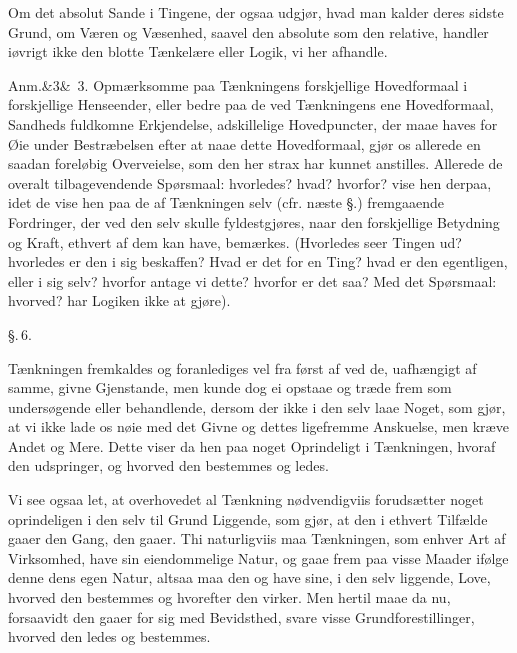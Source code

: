 \documentclass[12pt]{book}
\def\sperr#1{#1}%
\def\textit#1{#1}%
\def\emph#1{#1}%
\newcommand{\sperr}[1]{\textls[180]{#1}}
\newcommand{\parag}[1]{%
  \par\vspace{0.9\baselineskip}%
  {\centering\textit{\S.\,#1.}\par}%
  \vspace{0.35\baselineskip}%
  \noindent\hspace{\parindent}\ignorespaces
}
\newcommand{\anm}[1]{%
  \par\vspace{0.5\baselineskip}%
  \noindent\hspace{\parindent}\sperr{Anm.}\ifx&#1&\else~\textit{#1}.\fi
  \enspace\ignorespaces
}
\newcommand{\opage}[1]{\marginnote{\footnotesize\textit{[#1]}}}
\begin{document}
Om det \emph{absolut} Sande i Tingene, der ogsaa udgjør, hvad man kalder deres
sidste Grund, om Væren og Væsenhed, saavel den \emph{absolute}
\opage{20} som den \emph{relative}, handler iøvrigt ikke den blotte Tænkelære eller Logik,
vi her afhandle.

\anm{3} Opmærksomme paa Tænkningens forskjellige Hovedformaal i forskjellige
Henseender, eller bedre paa de ved Tænkningens ene Hovedformaal, Sandheds
fuldkomne Erkjendelse, adskillelige Hovedpuncter, der maae haves for Øie under
Bestræbelsen efter at naae dette Hovedformaal, gjør os allerede en saadan
foreløbig Overveielse, som den her strax har kunnet anstilles. Allerede de
overalt tilbagevendende Spørsmaal: \emph{hvorledes? hvad? hvorfor?} vise hen
derpaa, idet de vise hen paa de af Tænkningen selv (cfr. næste §.) fremgaaende
Fordringer, der ved den selv skulle fyldestgjøres, naar den forskjellige
Betydning og Kraft, ethvert af dem kan have, bemærkes. (Hvorledes seer Tingen
ud? hvorledes er den i sig beskaffen? Hvad er det for en Ting? hvad er den
egentligen, eller i sig selv? hvorfor antage vi dette? hvorfor er det saa? Med
det Spørsmaal: hvorved? har Logiken ikke at gjøre).

\parag{6}
Tænkningen fremkaldes og foranlediges vel fra først af ved de, uafhængigt af
samme, givne Gjenstande, men kunde dog ei opstaae og træde frem som
undersøgende eller behandlende, dersom der ikke i den selv laae Noget, som gjør,
at vi ikke lade os nøie med det Givne og dettes ligefremme Anskuelse, men kræve
Andet og Mere. Dette viser da hen paa
\opage{21} noget Oprindeligt i Tænkningen, hvoraf den udspringer, og hvorved den
bestemmes og ledes.

Vi see ogsaa let, at overhovedet al Tænkning nødvendigviis forudsætter noget
oprindeligen i den selv til Grund Liggende, som gjør, at den i ethvert Tilfælde
gaaer den Gang, den gaaer. Thi naturligviis maa Tænkningen, som enhver Art af
Virksomhed, have sin eiendommelige Natur, og gaae frem paa visse Maader ifølge
denne dens egen Natur, altsaa maa den og have sine, i den selv liggende, Love,
hvorved den bestemmes og hvorefter den virker. Men hertil maae da nu,
forsaavidt den gaaer for sig med Bevidsthed, svare visse Grundforestillinger,
hvorved den ledes og bestemmes.
\end{document}
